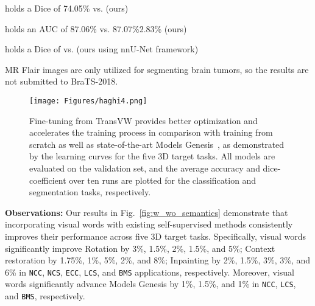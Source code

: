 \documentclass[journal,twoside,web]{ieeecolor}
\def\figurename{Fig.}
\begin{document}
\begin{table*}[t]
\begin{center}
\begin{threeparttable}
\begin{tablenotes}
       \item     \cite{wu2018joint} holds a Dice of 74.05\% vs.  (ours)
       \item    \cite{zhou2017fine} holds an AUC of 87.06\% vs. 87.07\%2.83\% (ours)
       \item     \cite{isensee2020automated} holds a Dice of  vs.   (ours using nnU-Net framework) 
        \item   MR Flair images are only utilized for segmenting brain tumors, so the results are not submitted to BraTS-2018. 
    \end{tablenotes}
    \end{threeparttable}
    \end{center}
\end{table*}


\begin{figure*}[!t]
\centerline{\texttt{[image: Figures/haghi4.png]}}
\caption{Fine-tuning from TransVW provides better optimization and accelerates the training process in comparison with training from scratch as well as state-of-the-art Models Genesis~\cite{zhou2019models}, as demonstrated by the learning curves for the five 3D target tasks. All models are evaluated on the validation set, and the average accuracy and dice-coefficient over ten runs are plotted for the classification and segmentation tasks, respectively.}
\label{fig:learning_curve}
\end{figure*}

\noindent\textbf{Observations:} Our results in \figurename~\ref{fig:w_wo_semantics} demonstrate that incorporating visual words with existing self-supervised methods consistently improves their performance across five 3D target tasks.
Specifically, visual words significantly improve Rotation by 3\%, 1.5\%, 2\%, 1.5\%, and 5\%; Context restoration by 1.75\%, 1\%, 5\%, 2\%, 
and 8\%; Inpainting by 2\%, 1.5\%, 3\%, 3\%, and 6\% in \texttt{NCC}, \texttt{NCS}, \texttt{ECC}, \texttt{LCS}, and \texttt{BMS} applications, respectively. Moreover, visual words significantly advance Models Genesis by 1\%, 1.5\%, and 1\% in \texttt{NCC}, \texttt{LCS}, and \texttt{BMS}, respectively.
\end{document}
